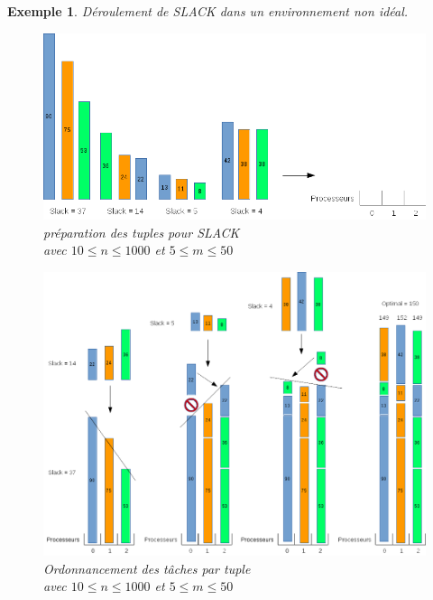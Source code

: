 \documentclass[a4paper,12pt]{report}
\theoremstyle{plain}				%
\newtheorem{example}{Exemple}
\theoremstyle{definition}				%
\begin{document}
\begin{example}
Déroulement de SLACK dans un environnement non idéal.

\begin{figure}
{\centering
\includegraphics[width=\columnwidth]{Slack_Non_Unif_Exemple_PasOk1.png}
\caption{préparation des tuples pour SLACK\\
\hspace{\linewidth} avec $10\leq n \leq 1000$ et $5\leq m \leq 50$}
\label{ex:SLACKPasOK1}
\par}
\end{figure}

\begin{figure}
{\centering
\includegraphics[width=\columnwidth]{Slack_Non_Unif_Exemple_PasOk2.png}
\caption{Ordonnancement des tâches par tuple\\
\hspace{\linewidth} avec $10\leq n \leq 1000$ et $5\leq m \leq 50$}
\label{ex:SLACKPasOK2}
\par}
\end{figure}


\end{example}
\end{document}
